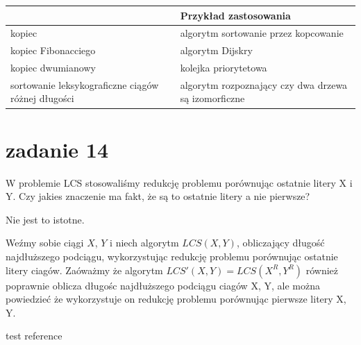 \documentclass[svgnames]{report}
\begin{document}
\begin{tabular}{l|l}
					&	Przykład zastosowania	\\	\hline
kopiec 				&	algorytm sortowanie przez kopcowanie	\\	\hline
kopiec Fibonacciego &	algorytm Dijskry	\\	\hline
kopiec dwumianowy 	&	kolejka priorytetowa	\\	\hline
sortowanie leksykograficzne ciągów różnej długości & algorytm rozpoznający czy dwa drzewa są izomorficzne	\\	\hline
\end{tabular}


\section{zadanie 14}
\begin{framed}
W problemie LCS stosowaliśmy redukcję problemu porównując ostatnie litery X i Y. Czy jakies znaczenie ma fakt, że są to ostatnie litery a nie pierwsze?
\end{framed}
Nie jest to istotne.

Weźmy sobie ciągi $X$, $Y$ i niech algorytm $LCS(X, Y)$, obliczający długość najdłuższego podciągu, wykorzystując redukcję problemu porównując ostatnie litery ciagów.
Zaóważmy że algorytm $LCS'(X, Y) = LCS(X^R, Y^R)$ również poprawnie oblicza długośc najdłuższego podciągu ciagów X, Y, ale można powiedzieć że wykorzystuje on redukcję problemu porównując pierwsze litery X, Y.



\begin{thebibliography}{99}
 test reference
\end{thebibliography}
\end{document}
